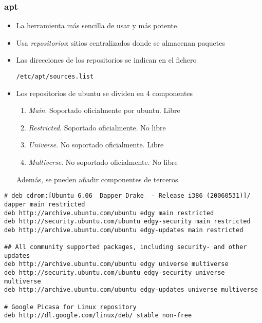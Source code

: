 \documentclass[ucs]{beamer}
\begin{document}
\begin{frame}[fragile]
\frametitle{apt}

\begin{itemize}
\item La herramienta más sencilla de usar y más potente.
\item Usa \emph{repositorios}: sitios centralizados
donde se almacenan paquetes
\item Las direcciones de los repositorios se indican en el       
  fichero 

\verb|/etc/apt/sources.list|
\item
Los repositorios de ubuntu se dividen en 4 componentes
\begin{enumerate}
\item
\emph{Main}. Soportado oficialmente por ubuntu. Libre
\item
\emph{Restricted}. Soportado oficialmente. No libre
\item
\emph{Universe}. No soportado oficialmente. Libre
\item
\emph{Multiverse}. No soportado oficialmente. No libre
\end{enumerate}

Además, se pueden añadir componentes de terceros 

\end{itemize}

\end{frame}


\begin{frame}[fragile]

\begin{scriptsize}
\begin{verbatim}
# deb cdrom:[Ubuntu 6.06 _Dapper Drake_ - Release i386 (20060531)]/ dapper main restricted
deb http://archive.ubuntu.com/ubuntu edgy main restricted
deb http://security.ubuntu.com/ubuntu edgy-security main restricted
deb http://archive.ubuntu.com/ubuntu edgy-updates main restricted

## All community supported packages, including security- and other updates
deb http://archive.ubuntu.com/ubuntu edgy universe multiverse
deb http://security.ubuntu.com/ubuntu edgy-security universe multiverse
deb http://archive.ubuntu.com/ubuntu edgy-updates universe multiverse

# Google Picasa for Linux repository
deb http://dl.google.com/linux/deb/ stable non-free
\end{verbatim}
\end{scriptsize}

\end{frame}
\end{document}
